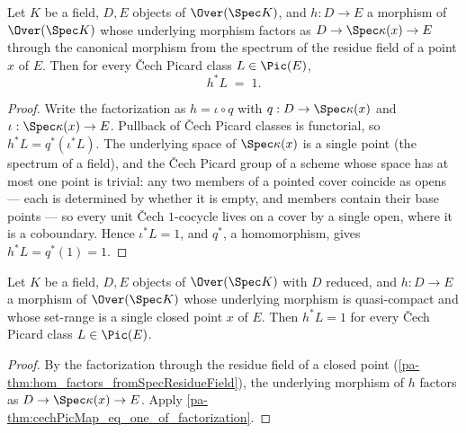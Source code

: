\begin{theorem}
  \label{pa-thm:cechPicMap_eq_one_of_factorization}
  \leanok

  Let \(K\) be a field, \(D, E\) objects of \(\Over(\Spec K)\), and \(h : D \to E\) a
  morphism of \(\Over(\Spec K)\) whose underlying morphism factors as
  \(D \to \Spec \kappa(x) \to E\) through the canonical morphism from the spectrum of
  the residue field of a point \(x\) of \(E\). Then for every \v Cech Picard class
  \(L \in \Pic(E)\),
  \[
    h^{*}L \;=\; 1 .
  \]
\end{theorem}
\begin{proof}
  \leanok
  Write the factorization as \(h = \iota \circ q\) with
  \(q : D \to \Spec \kappa(x)\) and \(\iota : \Spec \kappa(x) \to E\). Pullback of
  \v Cech Picard classes is functorial, so \(h^{*}L = q^{*}(\iota^{*}L)\). The
  underlying space of \(\Spec \kappa(x)\) is a single point (the spectrum of a field),
  and the \v Cech Picard group of a scheme whose space has at most one point is
  trivial: any two members of a pointed cover coincide as opens --- each is determined
  by whether it is empty, and members contain their base points --- so every unit
  \v Cech \(1\)-cocycle lives on a cover by a single open, where it is a coboundary.
  Hence \(\iota^{*}L = 1\), and \(q^{*}\), a homomorphism, gives
  \(h^{*}L = q^{*}(1) = 1\).
\end{proof}

\begin{corollary}
  \label{pa-cor:cechPicMap_eq_one_of_range_eq_singleton}
  \leanok

  Let \(K\) be a field, \(D, E\) objects of \(\Over(\Spec K)\) with \(D\) reduced, and
  \(h : D \to E\) a morphism of \(\Over(\Spec K)\) whose underlying morphism is
  quasi-compact and whose set-range is a single closed point \(x\) of \(E\). Then
  \(h^{*}L = 1\) for every \v Cech Picard class \(L \in \Pic(E)\).
\end{corollary}
\begin{proof}
  \leanok
  By the factorization through the residue field of a closed point
  (\ref{pa-thm:hom_factors_fromSpecResidueField}), the underlying morphism of \(h\)
  factors as \(D \to \Spec \kappa(x) \to E\). Apply
  \ref{pa-thm:cechPicMap_eq_one_of_factorization}.
\end{proof}

